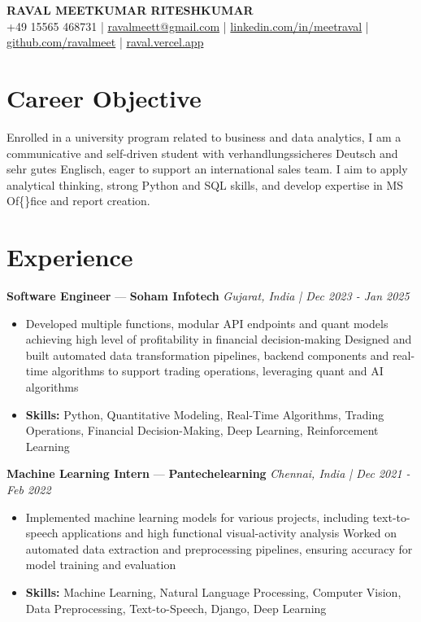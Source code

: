 \documentclass[a4paper,10pt]{article}
\begin{document}
\begin{center}
  {\Large\bfseries RAVAL MEETKUMAR RITESHKUMAR}\\[2pt]
  {\small +49 15565 468731 \;|\; \href{mailto:ravalmeett@gmail.com}{ravalmeett@gmail.com} \;|\; \href{https://www.linkedin.com/in/meetraval/}{linkedin.com/in/meetraval} \;|\; \href{https://github.com/ravalmeet}{github.com/ravalmeet} \;|\; \href{https://raval.vercel.app/}{raval.vercel.app}}
\end{center}
\vspace{-3pt}

\section*{Career Objective}
Enrolled in a university program related to business and data analytics, I am a communicative and self-driven student with verhandlungssicheres Deutsch and sehr gutes Englisch, eager to support an international sales team. I aim to apply analytical thinking, strong Python and SQL skills, and develop expertise in MS Of\{\}fice and report creation.\par

\section*{Experience}
\textbf{Software Engineer} — \textbf{Soham Infotech} \hfill \textit{Gujarat, India \;|\; Dec 2023 - Jan 2025}\par
\vspace{1pt}
\begin{itemize}
  \item Developed multiple functions, modular API endpoints and quant models achieving high level of profitability in financial decision-making Designed and built automated data transformation pipelines, backend components and real-time algorithms to support trading operations, leveraging quant and AI algorithms
  \item \textbf{Skills:} Python, Quantitative Modeling, Real-Time Algorithms, Trading Operations, Financial Decision-Making, Deep Learning, Reinforcement Learning
\end{itemize}
\vspace{3pt}
\textbf{Machine Learning Intern} — \textbf{Pantechelearning} \hfill \textit{Chennai, India \;|\; Dec 2021 - Feb 2022}\par
\vspace{1pt}
\begin{itemize}
  \item Implemented machine learning models for various projects, including text-to-speech applications and high functional visual-activity analysis Worked on automated data extraction and preprocessing pipelines, ensuring accuracy for model training and evaluation
  \item \textbf{Skills:} Machine Learning, Natural Language Processing, Computer Vision, Data Preprocessing, Text-to-Speech, Django, Deep Learning
\end{itemize}
\end{document}
